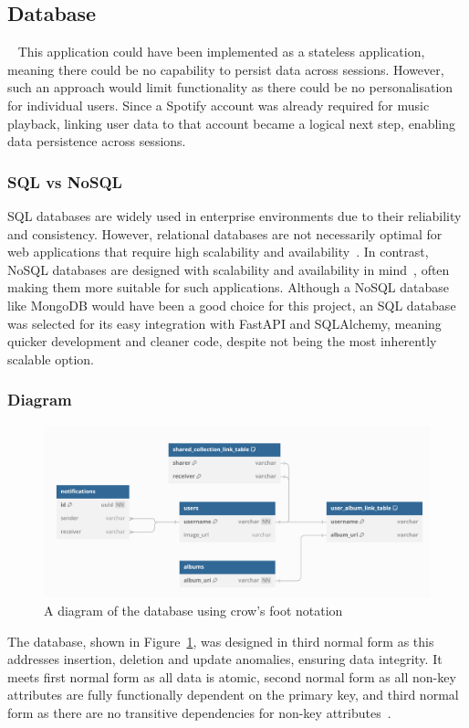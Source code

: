 \subsection{Database}~\label{sec:database}
This application could have been implemented as a stateless application, meaning there could be no capability to persist data across sessions. However, such an approach would limit functionality as there could be no personalisation for individual users. Since a Spotify account was already required for music playback, linking user data to that account became a logical next step, enabling data persistence across sessions.

\subsubsection{SQL vs NoSQL}
SQL databases are widely used in enterprise environments due to their reliability and consistency. However, relational databases are not necessarily optimal for web applications that require high scalability and availability~\cite{GANESHCHANDRA201513}. In contrast, NoSQL databases are designed with scalability and availability in mind~\cite{NoSQL}, often making them more suitable for such applications.
Although a NoSQL database like MongoDB would have been a good choice for this project, an SQL database was selected for its easy integration with FastAPI and SQLAlchemy, meaning quicker development and cleaner code, despite not being the most inherently scalable option.

\subsubsection{Diagram}
\begin{figure} [H]
    \centering
    \includegraphics[width=0.6\linewidth]{figures/db_diagram.png}
    \caption{A diagram of the database using crow's foot notation}
    \label{fig:database-diagram}
\end{figure}

The database, shown in Figure~\ref{fig:database-diagram}, was designed in third normal form as this addresses insertion, deletion and update anomalies, ensuring data integrity. It meets first normal form as all data is atomic, second normal form as all non-key attributes are fully functionally dependent on the primary key, and third normal form as there are no transitive dependencies for non-key attributes~\cite{10.1145/320493.320489}.

